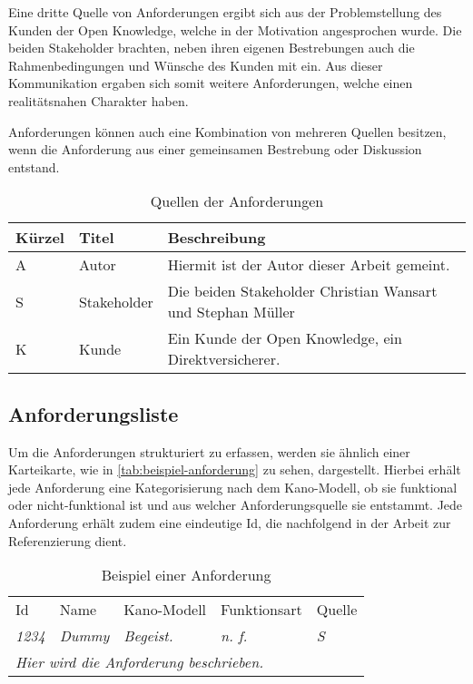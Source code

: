 Eine dritte Quelle von Anforderungen ergibt sich aus der Problemstellung des Kunden der Open Knowledge, welche in der Motivation angesprochen wurde. Die beiden Stakeholder brachten, neben ihren eigenen Bestrebungen auch die Rahmenbedingungen und Wünsche des Kunden mit ein. Aus dieser Kommunikation ergaben sich somit weitere Anforderungen, welche einen realitätsnahen Charakter haben.

Anforderungen können auch eine Kombination von mehreren Quellen besitzen, wenn die Anforderung aus einer gemeinsamen Bestrebung oder Diskussion entstand.

\begin{table}[H]
\begin{tabular}{ |p{1.15cm}|p{1.9cm}|p{10.45cm}| }
	\hline
	Kürzel & Titel       & Beschreibung \\
	\hline
	A      & Autor       & Hiermit ist der Autor dieser Arbeit gemeint. \\
	\hline
	S      & Stakeholder & Die beiden Stakeholder Christian Wansart und Stephan Müller \\
	\hline
	K      & Kunde       & Ein Kunde der Open Knowledge, ein Direktversicherer. \\
	\hline
\end{tabular}
 \captionsetup{justification=centering}
  \caption{Quellen der Anforderungen}
   \label{tab:quellen-der-anforderungen}
\end{table}
	
\subsection{Anforderungsliste}

Um die Anforderungen strukturiert zu erfassen, werden sie ähnlich einer Karteikarte, wie in \autoref{tab:beispiel-anforderung} zu sehen, dargestellt. Hierbei erhält jede Anforderung eine Kategorisierung nach dem Kano-Modell, ob sie funktional oder nicht-funktional ist und aus welcher Anforderungsquelle sie entstammt. Jede Anforderung erhält zudem eine eindeutige Id, die nachfolgend in der Arbeit zur Referenzierung dient.

\begin{table}[H]
\begin{tabular}{ |p{1.25cm}|p{5.5cm}|p{2.25cm}|p{2.1cm}|p{1.25cm}| }
\hline
Id            & Name          & Kano-Modell   & Funktionsart  & Quelle        \\
\textit{1234} & \textit{Dummy} & \textit{Begeist.} & \textit{n. f.} & \textit{S} \\
\hline
\multicolumn{5}{|l|}{\textit{Hier wird die Anforderung beschrieben.}} \\
\hline
\end{tabular}
 \captionsetup{justification=centering}
  \caption{Beispiel einer Anforderung}
   \label{tab:beispiel-anforderung}
\end{table}



